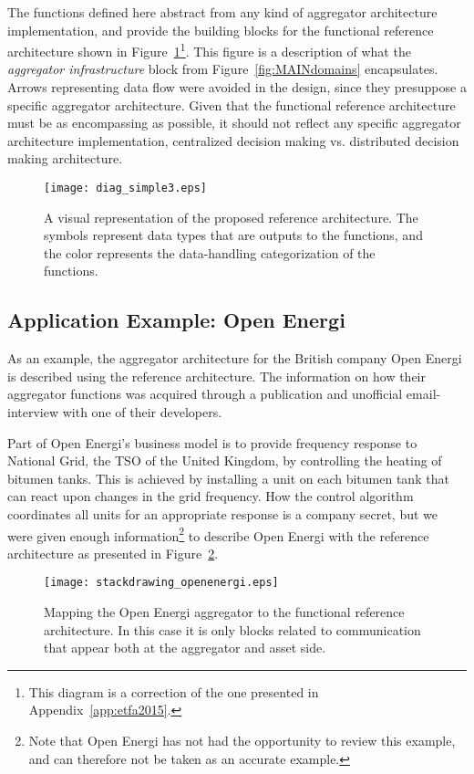 The functions defined here abstract from any kind of aggregator architecture implementation, and provide the building blocks for the functional reference architecture shown in Figure~\ref{fig:MAINrefarch}\footnote{This diagram is a correction of the one presented in Appendix~\ref{app:etfa2015}.}. This figure is a description of what the \emph{aggregator infrastructure} block from Figure~\ref{fig:MAINdomains} encapsulates. Arrows representing data flow were avoided in the design, since they presuppose a specific aggregator architecture. Given that the functional reference architecture must be as encompassing as possible, it should not reflect any specific aggregator architecture implementation, \eg centralized decision making vs. distributed decision making architecture. 
\begin{figure}[htb]
\centering
\texttt{[image: diag\_simple3.eps]}
\caption{A visual representation of the proposed reference architecture. The symbols represent data types that are outputs to the functions, and the color represents the data-handling categorization of the functions.}
\label{fig:MAINrefarch}
\end{figure}

\subsection{Application Example: Open Energi}
As an example, the aggregator architecture for the British company Open Energi is described using the reference architecture. The information on how their aggregator functions was acquired through a publication and unofficial email-interview with one of their developers.

Part of Open Energi's business model is to provide frequency response to National Grid, the TSO of the United Kingdom, by controlling the heating of bitumen tanks. This is achieved by installing a unit on each bitumen tank that can react upon changes in the grid frequency. How the control algorithm coordinates all units for an appropriate response is a company secret, but we were given enough information\footnote{Note that Open Energi has not had the opportunity to review this example, and can therefore not be taken as an accurate example.} to describe Open Energi with the reference architecture as presented in Figure~\ref{fig:openenergirefarch}.

\begin{figure}[htb]
\centering
\texttt{[image: stackdrawing\_openenergi.eps]}
\caption{Mapping the Open Energi aggregator to the functional reference architecture. In this case it is only blocks related to communication that appear both at the aggregator and asset side.}
\label{fig:openenergirefarch}
\end{figure}


